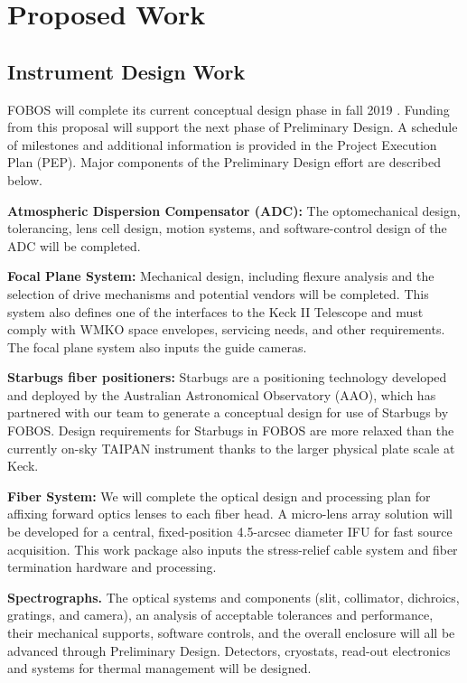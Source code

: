 
\section{Proposed Work}
\label{sec:design}

\subsection{Instrument Design Work}

FOBOS will complete its current conceptual design phase in fall 2019
. Funding from this proposal will support the
next phase of Preliminary Design. A schedule of milestones and
additional information is provided in the Project Execution Plan
(PEP). Major components of the Preliminary Design effort are
described below.

\noindent \textbf{Atmospheric Dispersion Compensator (ADC):} The
optomechanical design, tolerancing, lens cell design, motion systems,
and software-control design of the ADC will be completed.  

\noindent \textbf{Focal Plane System:} Mechanical design, including flexure analysis and
the selection of drive mechanisms and potential vendors will be
completed.  This system also defines one of the interfaces to the Keck
II Telescope and must comply with WMKO space envelopes, servicing needs,
and other requirements.  The focal plane system also inputs the
guide cameras.

\noindent \textbf{Starbugs fiber positioners:} Starbugs are a
positioning technology developed and deployed by the Australian
Astronomical Observatory (AAO), which has partnered with our team to
generate a conceptual design for use of Starbugs by FOBOS.  Design
requirements for Starbugs in FOBOS are more relaxed than the currently
on-sky TAIPAN instrument thanks to the larger physical plate scale at
Keck.  

\noindent \textbf{Fiber System:} We will complete the optical design and
processing plan for affixing forward optics lenses to each fiber head.  A
micro-lens array solution will be developed for a central,
fixed-position 4.5-arcsec diameter IFU for fast source acquisition. This
work package also inputs the stress-relief cable system and fiber
termination hardware and processing.

\noindent \textbf{Spectrographs.} The optical systems and components
(slit, collimator, dichroics, gratings, and camera), an analysis of
acceptable tolerances and performance, their mechanical supports,
software controls, and the overall enclosure will all be advanced
through Preliminary Design.  Detectors, cryostats, read-out electronics
and systems for thermal management will be designed.

